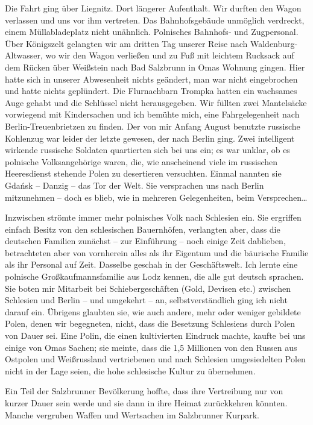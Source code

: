\documentclass[a5paper,pagesize,10pt,twoside=true]{scrbook}
\renewcommand{\marginpar}[2][]{}
\begin{document}
Die Fahrt ging über Liegnitz. Dort längerer Aufenthalt. Wir durften den Wagon verlassen und uns vor ihm vertreten. Das Bahnhofsgebäude unmöglich verdreckt, einem Müllabladeplatz nicht unähnlich. Polnisches Bahnhofs- und Zugpersonal. Über Königszelt gelangten wir am dritten Tag unserer Reise nach Waldenburg-Altwasser, wo wir den Wagon verließen und zu Fuß mit leichtem Rucksack auf dem Rücken über Weißstein nach Bad Salzbrunn in Omas Wohnung gingen. Hier hatte sich in unserer Abwesenheit nichts geändert, man war nicht eingebrochen und hatte nichts geplündert. Die Flurnachbarn Trompka hatten ein wachsames Auge gehabt und die Schlüssel nicht herausgegeben. Wir füllten zwei Mantelsäcke vorwiegend mit Kindersachen und ich bemühte mich, eine Fahrgelegenheit nach Berlin-Treuenbrietzen zu finden. Der von mir Anfang August benutzte russische Kohlenzug war leider der letzte gewesen, der nach Berlin ging. Zwei intelligent wirkende russische Soldaten quartierten sich bei uns ein; es war unklar, ob es polnische Volksangehörige waren, die, wie anscheinend viele im russischen Heeresdienst stehende Polen zu desertieren versuchten. Einmal nannten sie Gdańsk -- Danzig -- das Tor der Welt. Sie versprachen uns nach Berlin mitzunehmen -- doch es blieb, wie in mehreren Gelegenheiten, beim Versprechen\dots

Inzwischen strömte immer mehr polnisches Volk nach Schlesien ein. Sie ergriffen einfach Besitz von den schlesischen Bauernhöfen, verlangten aber, dass die deutschen Familien zunächst -- zur Einführung -- noch einige Zeit dablieben, betrachteten aber von vornherein alles als ihr Eigentum und die bäurische Familie als ihr Personal auf Zeit. Dasselbe \marginpar{111} geschah in der Geschäftswelt. Ich lernte eine polnische Großkaufmannsfamilie aus Lodz kennen, die alle gut deutsch sprachen. Sie boten mir Mitarbeit bei Schiebergeschäften (Gold, Devisen etc.) zwischen Schlesien und Berlin -- und umgekehrt -- an, selbstverständlich ging ich nicht darauf ein. Übrigens glaubten sie, wie auch andere, mehr oder weniger gebildete Polen, denen wir begegneten, nicht, dass die Besetzung Schlesiens durch Polen von Dauer sei. Eine Polin, die einen kultivierten Eindruck machte, kaufte bei uns einige von Omas Sachen; sie meinte, dass die 1,5 Millionen von den Russen aus Ostpolen und Weißrussland vertriebenen und nach Schlesien umgesiedelten Polen nicht in der Lage seien, die hohe schlesische Kultur zu übernehmen.

Ein Teil der Salzbrunner Bevölkerung hoffte, dass ihre Vertreibung nur von kurzer Dauer sein werde und sie dann in ihre Heimat zurückkehren könnten. Manche vergruben Waffen und Wertsachen im Salzbrunner Kurpark.
\end{document}
